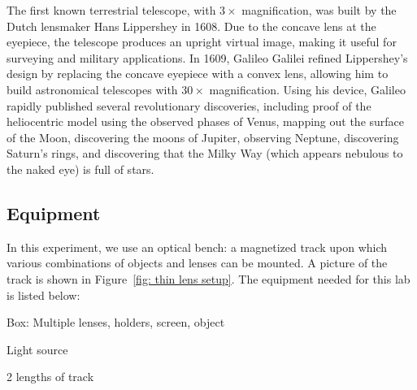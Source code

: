 \documentclass[addpoints]{physlabs}
\begin{document}
\begin{labsection}
\begin{theory}
    The first known terrestrial telescope, with $3\times$ magnification, was built by the Dutch lensmaker Hans Lippershey in 1608. Due to the concave lens at the eyepiece, the telescope produces an upright virtual image, making it useful for surveying and military applications. In 1609, Galileo Galilei refined Lippershey's design by replacing the concave eyepiece with a convex lens, allowing him to build astronomical telescopes with $30\times$ magnification. Using his device, Galileo rapidly published several revolutionary discoveries, including proof of the heliocentric model using the observed phases of Venus, mapping out the surface of the Moon, discovering the moons of Jupiter, observing Neptune, discovering Saturn's rings, and discovering that the Milky Way (which appears nebulous to the naked eye) is full of stars.

\end{theory}

\begin{experiment}

    \subsection*{Equipment}

    In this experiment, we use an optical bench: a magnetized track upon which various combinations of objects and lenses can be mounted. A picture of the track is shown in Figure~\ref{fig: thin lens setup}. The equipment needed for this lab is listed below:
    
    \begin{todolist}
        \item Box: Multiple lenses, holders, screen, object
        \item Light source
        \item 2 lengths of track
    \end{todolist}


\end{experiment}
\end{labsection}
\end{document}
